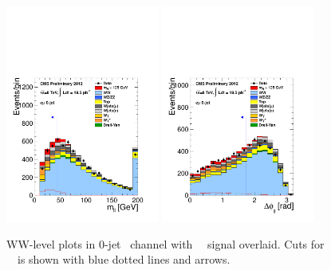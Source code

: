 \begin{figure}[htp]
\includegraphics[width=0.45\textwidth]{figures/hww_analysis16_125_ALL_of_0j_mll.pdf}
\includegraphics[width=0.45\textwidth]{figures/hww_analysis16_125_ALL_of_0j_dphi.pdf}
\caption{ WW-level plots in 0-jet \DF\ channel with ~\GeV\ signal overlaid. 
Cuts for ~\GeV\ is shown with blue dotted lines and arrows. 
}
\label{fig:wwlevelmh125}
\end{figure}

